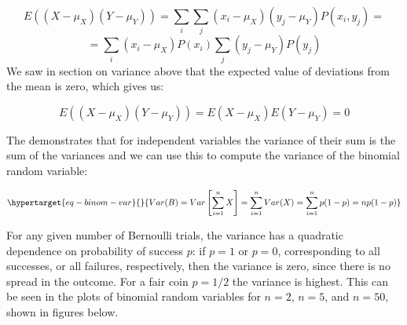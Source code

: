 \documentclass[
  letterpaper,
  DIV=11,
  numbers=noendperiod]{scrreprt}
\begin{document}
\[E((X-\mu_X)(Y-\mu_Y))  =  \sum_i \sum_j (x_i-\mu_X) (y_j-\mu_Y) P(x_i, y_j) =  \]
\[ = \sum_i(x_i-\mu_X)P(x_i) \sum_j (y_j-\mu_Y) P(y_j) \] We saw in
section on variance above that the expected value of deviations from the
mean is zero, which gives us:

\[E((X-\mu_X)(Y-\mu_Y))  = E(X-\mu_X)E(Y-\mu_Y) = 0\]

The demonstrates that for independent variables the variance of their
sum is the sum of the variances and we can use this to compute the
variance of the binomial random variable:

\begin{equation}\protect\hypertarget{eq-binom-var}{}{
Var(B) = Var\left[\sum_{i=1}^n X\right]  = \sum_{i=1}^n Var(X) =\sum_{i=1}^n p(1-p) = np(1-p)
}\label{eq-binom-var}\end{equation}

For any given number of Bernoulli trials, the variance has a quadratic
dependence on probability of success \(p\): if \(p=1\) or \(p=0\),
corresponding to all successes, or all failures, respectively, then the
variance is zero, since there is no spread in the outcome. For a fair
coin \(p=1/2\) the variance is highest. This can be seen in the plots of
binomial random variables for \(n=2\), \(n=5\), and \(n=50\), shown in
figures below.
\end{document}
